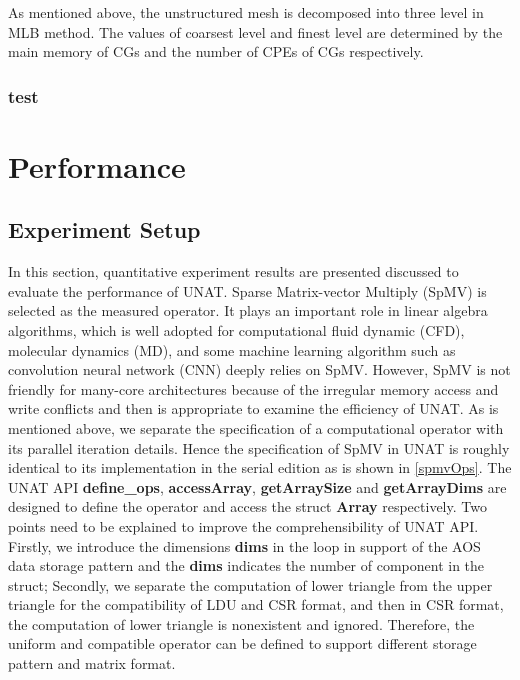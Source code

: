 \documentclass[conference]{IEEEtran}
\begin{document}
As mentioned above, the unstructured mesh is decomposed into three level in MLB method. The values of coarsest level and finest level are determined by the main memory of CGs and the number of CPEs of CGs respectively.

\subsubsection{test}

\section{Performance}

\subsection{Experiment Setup}
In this section, quantitative experiment results are presented discussed to evaluate the performance of UNAT. Sparse Matrix-vector Multiply (SpMV) is selected as the measured operator. It plays an important role in linear algebra algorithms, which is well adopted for computational fluid dynamic (CFD), molecular dynamics (MD), and some machine learning algorithm such as convolution neural network (CNN) deeply relies on SpMV. However, SpMV is not friendly for many-core architectures because of the irregular memory access and write conflicts \cite{b8} and then is appropriate to examine the efficiency of UNAT. As is mentioned above, we separate the specification of a computational operator with its parallel iteration details. Hence the specification of SpMV in UNAT is roughly identical to its implementation in the serial edition as is shown in \ref{spmvOps}. The UNAT API \textbf{define\_ops}, \textbf{accessArray}, \textbf{getArraySize} and \textbf{getArrayDims} are designed to define the operator and access the struct \textbf{Array} respectively. Two points need to be explained to improve the comprehensibility of UNAT API. Firstly, we introduce the dimensions \textbf{dims} in the loop in support of the AOS data storage pattern and the \textbf{dims} indicates the number of component in the struct; Secondly, we separate the computation of lower triangle from the upper triangle for the compatibility of LDU and CSR format, and then in CSR format, the computation of lower triangle is nonexistent and ignored. Therefore, the uniform and compatible operator can be defined to support different storage pattern and matrix format.
\end{document}
